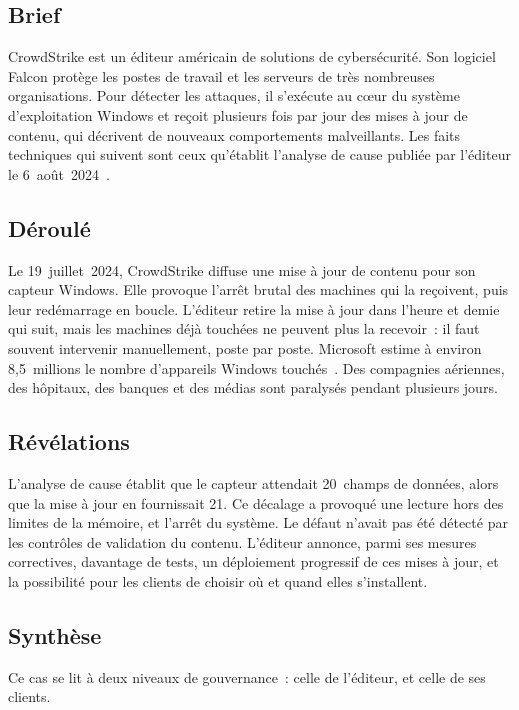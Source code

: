 \subsection{Brief}

CrowdStrike est un éditeur américain de solutions de cybersécurité. Son
logiciel Falcon protège les postes de travail et les serveurs de très
nombreuses organisations. Pour détecter les attaques, il s'exécute au cœur
du système d'exploitation Windows et reçoit plusieurs fois par jour des
mises à jour de contenu, qui décrivent de nouveaux comportements
malveillants. Les faits techniques qui suivent sont ceux qu'établit
l'analyse de cause publiée par l'éditeur le 6~août~2024~\cite{crowdstrike2024rca}.

\subsection{Déroulé}

Le 19~juillet~2024, CrowdStrike diffuse une mise à jour de contenu pour
son capteur Windows. Elle provoque l'arrêt brutal des machines qui la
reçoivent, puis leur redémarrage en boucle. L'éditeur retire la mise à
jour dans l'heure et demie qui suit, mais les machines déjà touchées ne
peuvent plus la recevoir~: il faut souvent intervenir manuellement, poste
par poste. Microsoft estime à environ 8,5~millions le nombre d'appareils
Windows touchés~\cite{microsoft2024crowdstrike}. Des compagnies aériennes,
des hôpitaux, des banques et des médias sont paralysés pendant plusieurs
jours.

\subsection{Révélations}

L'analyse de cause établit que le capteur attendait 20~champs de données,
alors que la mise à jour en fournissait 21. Ce décalage a provoqué une
lecture hors des limites de la mémoire, et l'arrêt du système. Le défaut
n'avait pas été détecté par les contrôles de validation du contenu.
L'éditeur annonce, parmi ses mesures correctives, davantage de tests, un
déploiement progressif de ces mises à jour, et la possibilité pour les
clients de choisir où et quand elles s'installent.

\subsection{Synthèse}

Ce cas se lit à deux niveaux de gouvernance~: celle de l'éditeur, et celle
de ses clients.

